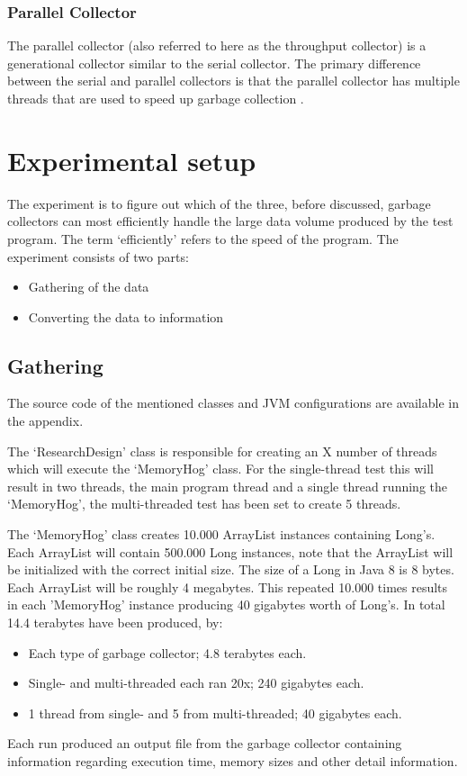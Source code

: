 \documentclass[11pt,a4paper]{article}
\begin{document}
\subsubsection*{Parallel  Collector}
The parallel collector (also referred to here as the throughput collector) is a generational collector similar to the serial collector. The primary difference between the serial and parallel collectors is that the parallel collector has multiple threads that are used to speed up garbage collection \cite{ORACLE_PARALLEL}.

\newpage
\section{Experimental setup}
The experiment is to figure out which of the three, before discussed, garbage collectors can most efficiently handle the large data volume produced by the test program. The term `efficiently' refers to the speed of the program. The experiment consists of two parts:
\begin{itemize}
    \item Gathering of the data
    \item Converting the data to information
\end{itemize}

\subsection{Gathering}
The source code of the mentioned classes and JVM configurations are available in the appendix.

The `ResearchDesign' class is responsible for creating an X number of threads which will execute the `MemoryHog' class. For the single-thread test this will result in two threads, the main program thread and a single thread running the `MemoryHog', the multi-threaded test has been set to create 5 threads.

The `MemoryHog' class creates 10.000 ArrayList instances containing Long's. Each ArrayList will contain 500.000 Long instances, note that the ArrayList will be initialized with the correct initial size. The size of a Long in Java 8 is 8 bytes. Each ArrayList will be roughly 4 megabytes. This repeated 10.000 times results in each 'MemoryHog' instance producing 40 gigabytes worth of Long's. In total 14.4 terabytes have been produced, by:
\begin{itemize}
    \item Each type of garbage collector; 4.8 terabytes each.
    \item Single- and multi-threaded each ran 20x; 240 gigabytes each.
    \item 1 thread from single- and 5 from multi-threaded; 40 gigabytes each.
\end{itemize}
Each run produced an output file from the garbage collector containing information regarding execution time, memory sizes and other detail information.
\end{document}
